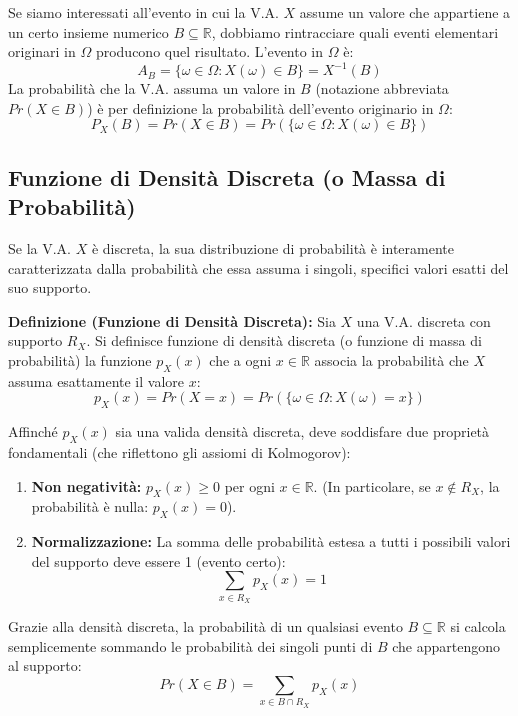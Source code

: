 \documentclass[12pt, a4paper]{article}
\begin{document}
Se siamo interessati all'evento in cui la V.A. $X$ assume un valore che appartiene a un certo insieme numerico $B \subseteq \mathbb{R}$, dobbiamo rintracciare quali eventi elementari originari in $\Omega$ producono quel risultato.
L'evento in $\Omega$ è:
$$ A_B = \{\omega \in \Omega : X(\omega) \in B\} = X^{-1}(B) $$
La probabilità che la V.A. assuma un valore in $B$ (notazione abbreviata $Pr(X \in B)$) è per definizione la probabilità dell'evento originario in $\Omega$:
$$ P_X(B) = Pr(X \in B) = Pr(\{\omega \in \Omega : X(\omega) \in B\}) $$

\subsection{Funzione di Densità Discreta (o Massa di Probabilità)}
Se la V.A. $X$ è discreta, la sua distribuzione di probabilità è interamente caratterizzata dalla probabilità che essa assuma i singoli, specifici valori esatti del suo supporto.

\textbf{Definizione (Funzione di Densità Discreta):} Sia $X$ una V.A. discreta con supporto $R_X$. Si definisce funzione di densità discreta (o funzione di massa di probabilità) la funzione $p_X(x)$ che a ogni $x \in \mathbb{R}$ associa la probabilità che $X$ assuma esattamente il valore $x$:
$$ p_X(x) = Pr(X = x) = Pr(\{\omega \in \Omega : X(\omega) = x\}) $$

Affinché $p_X(x)$ sia una valida densità discreta, deve soddisfare due proprietà fondamentali (che riflettono gli assiomi di Kolmogorov):
\begin{enumerate}
    \item \textbf{Non negatività:} $p_X(x) \ge 0$ per ogni $x \in \mathbb{R}$. (In particolare, se $x \notin R_X$, la probabilità è nulla: $p_X(x) = 0$).
    \item \textbf{Normalizzazione:} La somma delle probabilità estesa a tutti i possibili valori del supporto deve essere 1 (evento certo):
    $$ \sum_{x \in R_X} p_X(x) = 1 $$
\end{enumerate}

Grazie alla densità discreta, la probabilità di un qualsiasi evento $B \subseteq \mathbb{R}$ si calcola semplicemente sommando le probabilità dei singoli punti di $B$ che appartengono al supporto:
$$ Pr(X \in B) = \sum_{x \in B \cap R_X} p_X(x) $$
\end{document}
